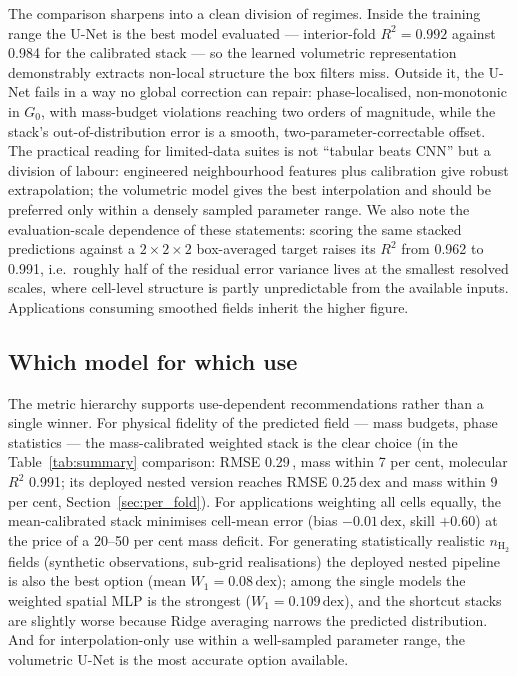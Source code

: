 \documentclass[fleqn,usenatbib]{rasti}
\newcommand{\nHH}{n_{\mathrm{H_2}}}
\newcommand{\Gzero}{G_0}
\newcommand{\dex}{\,\text{dex}}
\newcommand{\Rsq}{R^2}
\begin{document}
The comparison sharpens into a clean division of regimes. Inside the
training range the U-Net is the best model evaluated --- interior-fold
\(\Rsq = 0.992\) against 0.984 for the calibrated stack --- so the learned
volumetric representation demonstrably extracts non-local structure the
box filters miss. Outside it, the U-Net fails in a way no global
correction can repair: phase-localised, non-monotonic in \(\Gzero\), with
mass-budget violations reaching two orders of magnitude, while the
stack's out-of-distribution error is a smooth, two-parameter-correctable
offset. The practical reading for limited-data suites is not
``tabular beats CNN'' but a division of labour: engineered neighbourhood
features plus calibration give robust extrapolation; the volumetric
model gives the best interpolation and should be preferred only within
a densely sampled parameter range. We also note the evaluation-scale
dependence of these statements: scoring the same stacked predictions
against a \(2\times2\times2\) box-averaged target raises its \(\Rsq\) from
0.962 to 0.991, i.e.\ roughly half of the residual error variance lives
at the smallest resolved scales, where cell-level structure is partly
unpredictable from the available inputs. Applications consuming
smoothed fields inherit the higher figure.

\subsection{Which model for which use}
\label{sec:whichmodel}

The metric hierarchy supports use-dependent recommendations rather than
a single winner. For physical fidelity of the predicted field --- mass
budgets, phase statistics --- the mass-calibrated weighted stack is the
clear choice (in the Table~\ref{tab:summary} comparison:
RMSE 0.29\dex, mass within 7 per cent, molecular \(\Rsq\) 0.991; its
deployed nested version reaches RMSE \(0.25\dex\) and mass within
9 per cent, Section~\ref{sec:per_fold}). For applications weighting
all cells equally, the mean-calibrated stack minimises cell-mean error
(bias \(-0.01\dex\), skill \(+0.60\)) at the price of a 20--50 per cent
mass deficit. For generating statistically realistic \(\nHH\) fields
(synthetic observations, sub-grid realisations) the deployed nested
pipeline is also the best option (mean \(W_1 = 0.08\dex\)); among the
single models the weighted spatial MLP is the strongest
(\(W_1 = 0.109\dex\)), and the shortcut stacks are slightly worse
because Ridge averaging narrows the predicted distribution. And for
interpolation-only use within a well-sampled parameter range, the
volumetric U-Net is the most accurate option available.
\end{document}
